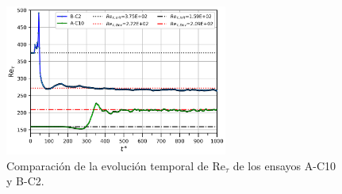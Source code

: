 
\begin{figure}[H]
  \centering  
    \includegraphics[width=0.65\textwidth]{figures/cap6/comp_retau.png}
  \caption{Comparación de la evolución temporal de Re$_{\tau}$ de los ensayos A-C10 y B-C2.}
  \label{fig:retau-comp}
\end{figure}






